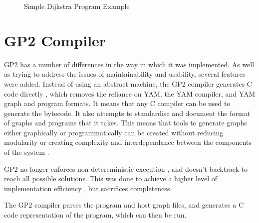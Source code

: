 \documentclass{UoYCSproject}
\begin{document}
\begin{figure}
\caption{Simple Dijkstra Program Example}
\end{figure}

\restoregeometry

\section{GP2 Compiler}
GP2 has a number of differences in the way in which it was implemented. As well as trying to address the issues of maintainability and usability, several features were added.
Instead of using an abstract machine, the GP2 compiler generates C code directly \cite{chris_compiler}, which removes the reliance on YAM, the YAM compiler, and YAM graph and program formats. It means that any C compiler can be used to generate the bytecode. It also attempts to standardise and document the format of graphs and programs that it takes. This means that tools to generate graphs either graphically or programmatically can be created without reducing modularity or creating complexity and interdependance between the components of the system \cite{gp2_ide}.

GP2 no longer enforces non-detereministic execution \cite[p. 15]{gp2_ide}, and doesn't backtrack to reach all possible solutions. This was done to achieve a higher level of implementation efficiency \cite[p. 15]{chris_compiler}, but sacrifices completeness.

The GP2 compiler parses the program and host graph files, and generates a C code representation of the program, which can then be run.

\end{document}
